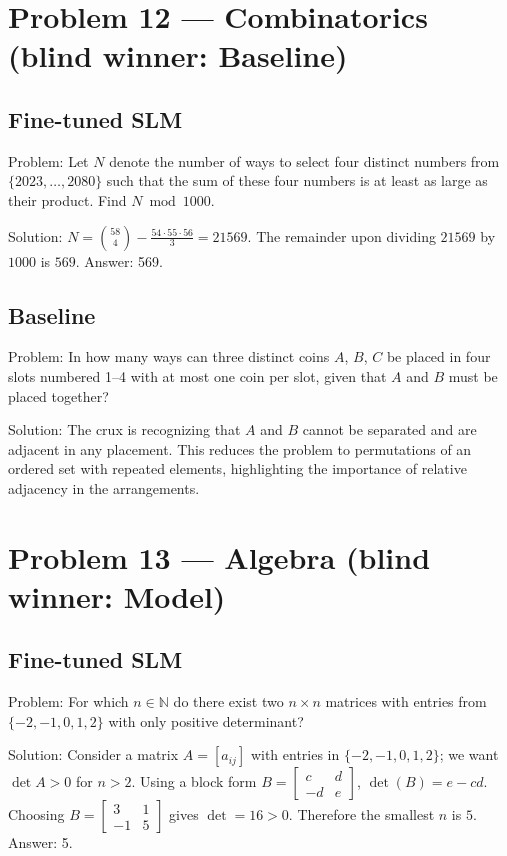 \documentclass[11pt]{article}
\begin{document}
\section*{Problem 12 --- Combinatorics \quad(blind winner: Baseline)}

\subsection*{Fine-tuned SLM}

Problem:
Let $N$ denote the number of ways to select four distinct numbers from $\{2023,\dots,2080\}$ such that the sum of these four numbers is at least as large as their product. Find $N \bmod 1000$.

Solution:
$N=\binom{58}{4}-\frac{54\cdot 55\cdot 56}{3}=21569$. The remainder upon dividing $21569$ by $1000$ is $569$. Answer: 569.

\subsection*{Baseline}

Problem:
In how many ways can three distinct coins $A$, $B$, $C$ be placed in four slots numbered 1--4 with at most one coin per slot, given that $A$ and $B$ must be placed together?

Solution:
The crux is recognizing that $A$ and $B$ cannot be separated and are adjacent in any placement. This reduces the problem to permutations of an ordered set with repeated elements, highlighting the importance of relative adjacency in the arrangements.

\section*{Problem 13 --- Algebra \quad(blind winner: Model)}

\subsection*{Fine-tuned SLM}

Problem:
For which $n \in\mathbb{N}$ do there exist two $n\times n$ matrices with entries from $\{-2,-1,0,1,2\}$ with only positive determinant?

Solution:
Consider a matrix $A=[a_{ij}]$ with entries in $\{-2,-1,0,1,2\}$; we want $\det A>0$ for $n>2$. Using a block form $B=\begin{bmatrix} c & d \\ -d & e\end{bmatrix}$, $\det(B)=e-cd$. Choosing $B=\begin{bmatrix}3&1\\-1&5\end{bmatrix}$ gives $\det=16>0$. Therefore the smallest $n$ is $\boxed{5}$. Answer: 5.
\end{document}
